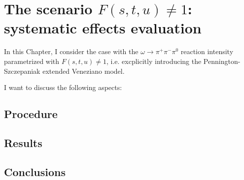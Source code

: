 \documentclass[a4paper,10pt]{report}
\newcommand{\decay}{$\omega \rightarrow \pi^+ \pi^- \pi^0$ }
\begin{document}
\chapter{The scenario $F(s,t,u) \neq 1$: systematic effects evaluation}

In this Chapter, I consider the case with the \decay reaction intensity parametrized with $F(s,t,u) \neq 1$, i.e. excplicitly introducing the Pennington-Szczepaniak extended Veneziano model.

I want to discuss the following aspects:

\section{Procedure}

\section{Results}

\section{Conclusions}
\end{document}

